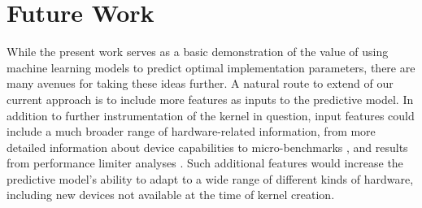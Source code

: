 \documentclass{sig-alternate}
\begin{document}
% 
% 
% 
% 
% 
% 
% 
% 
% 
% 
% 
% 
% 
% 

\section{Future Work}

While the present work serves as a basic demonstration of the value of using
machine learning models to predict optimal implementation parameters, there are
many avenues for taking these ideas further. A natural route to extend of our
current approach is to include more features as inputs to the predictive model.
In addition to further instrumentation of the kernel in question, input
features could include a much broader range of hardware-related information,
from more detailed information about device capabilities to micro-benchmarks
\citep{wong2010demystifying}, and results from performance limiter analyses
\citep{micikevicius2010analysis}. Such additional features would increase the
predictive model's ability to adapt to a wide range of different kinds of
hardware, including new devices not available at the time of kernel creation.
\end{document}
